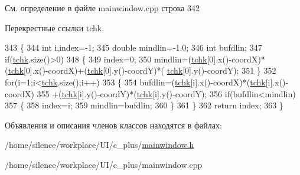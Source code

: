 См. определение в файле mainwindow.\+cpp строка 342



Перекрестные ссылки tchk.


\begin{DoxyCode}
343 \{
344     \textcolor{keywordtype}{int} i,index=-1;
345     \textcolor{keywordtype}{double} mindlin=-1.0;
346     \textcolor{keywordtype}{int} bufdlin;
347     \textcolor{keywordflow}{if}(\hyperlink{classgraph_afae7c6852c8de983693fb2fd108ed3c4}{tchk}.size()>0)
348     \{
349         index=0;
350         mindlin=(\hyperlink{classgraph_afae7c6852c8de983693fb2fd108ed3c4}{tchk}[0].x()-coordX)*(\hyperlink{classgraph_afae7c6852c8de983693fb2fd108ed3c4}{tchk}[0].x()-coordX)+(\hyperlink{classgraph_afae7c6852c8de983693fb2fd108ed3c4}{tchk}[0].y()-coordY)*(
      \hyperlink{classgraph_afae7c6852c8de983693fb2fd108ed3c4}{tchk}[0].y()-coordY);
351     \}
352     \textcolor{keywordflow}{for}(i=1;i<\hyperlink{classgraph_afae7c6852c8de983693fb2fd108ed3c4}{tchk}.size();i++)
353     \{
354         bufdlin=(\hyperlink{classgraph_afae7c6852c8de983693fb2fd108ed3c4}{tchk}[i].x()-coordX)*(\hyperlink{classgraph_afae7c6852c8de983693fb2fd108ed3c4}{tchk}[i].x()-coordX)
355                 +(\hyperlink{classgraph_afae7c6852c8de983693fb2fd108ed3c4}{tchk}[i].y()-coordY)*(\hyperlink{classgraph_afae7c6852c8de983693fb2fd108ed3c4}{tchk}[i].y()-coordY);
356         \textcolor{keywordflow}{if}(bufdlin<mindlin)
357         \{
358             index=i;
359             mindlin=bufdlin;
360         \}
361     \}
362     \textcolor{keywordflow}{return} index;
363 \}
\end{DoxyCode}


Объявления и описания членов классов находятся в файлах\+:\begin{DoxyCompactItemize}
\item 
/home/silence/workplace/\+U\+I/c\+\_\+plus/\hyperlink{mainwindow_8h}{mainwindow.\+h}\item 
/home/silence/workplace/\+U\+I/c\+\_\+plus/mainwindow.\+cpp\end{DoxyCompactItemize}
